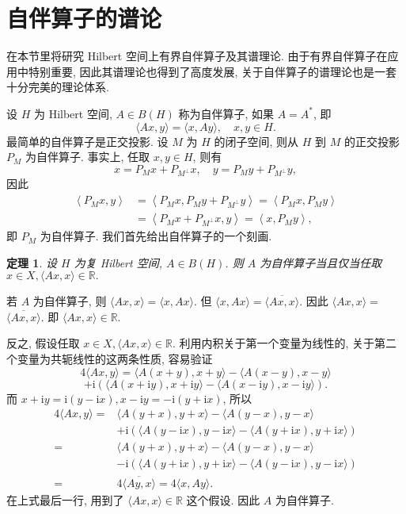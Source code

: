 \documentclass[openany]{ctexbook}
\makeatletter
\theoremstyle{kaiti}
\newtheorem{theorem}{定理}[section]
\theoremstyle{normal}
\renewenvironment{proof}[1][\proofname]{\par
    \pushQED{\qed}%
    \normalfont \topsep6\p@\@plus6\p@\relax
    \trivlist
    \item\relax
    {\heiti #1}\hspace{2\labelsep}\ignorespaces
  }{%
    \popQED\endtrivlist\@endpefalse
  }
\makeatother
\begin{document}
\section{自伴算子的谱论}

在本节里将研究 Hilbert 空间上有界自伴算子及其谱理论. 由于有界自伴算子在应用中特别重要, 因此其谱理论也得到了高度发展, 关于自伴算子的谱理论也是一套十分完美的理论体系.

设 $H$ 为 Hilbert 空间, $A \in B(H)$ 称为自伴算子, 如果 $A=A^{*}$, 即
$$
\langle A x, y\rangle=\langle x, A y\rangle, \quad x, y \in H.
$$
最简单的自伴算子是正交投影. 设 $M$ 为 $H$ 的闭子空间, 则从 $H$ 到 $M$ 的正交投影 $P_{M}$ 为自伴算子. 事实上, 任取 $x, y \in H$, 则有
$$
x=P_{M} x+P_{M^{\perp}} x, \quad y=P_{M} y+P_{M^{\perp}} y,
$$
因此
$$
\begin{aligned}
\left\langle P_{M} x, y\right\rangle &=\left\langle P_{M} x, P_{M} y+P_{M^{\perp}} y\right\rangle=\left\langle P_{M} x, P_{M} y\right\rangle \\
&=\left\langle P_{M} x+P_{M^{\perp}} x, y\right\rangle=\left\langle x, P_{M} y\right\rangle,
\end{aligned}
$$
即 $P_{M}$ 为自伴算子. 我们首先给出自伴算子的一个刻画.

\begin{theorem}
设 $H$ 为复 Hilbert 空间, $A \in B(H)$. 则 $A$ 为自伴算子当且仅当任取 $x \in X,\langle A x, x\rangle \in \mathbb{R}.$
\end{theorem}

\begin{proof}
若 $A$ 为自伴算子, 则 $\langle A x, x\rangle=\langle x, A x\rangle$. 但 $\langle x, A x\rangle=\overline{\langle A x, x\rangle}$. 因此 $\langle A x, x\rangle=$ $\overline{\langle A x, x\rangle}$. 即 $\langle A x, x\rangle \in \mathbb{R}$.

反之, 假设任取 $x \in X,\langle A x, x\rangle \in \mathbb{R}$. 利用内积关于第一个变量为线性的, 关于第二个变量为共轭线性的这两条性质, 容易验证
$$
4\langle A x, y\rangle=\langle A(x+y), x+y\rangle-\langle A(x-y), x-y\rangle
$$
$$
+\mathrm{i}(\langle A(x+\mathrm{i} y), x+\mathrm{i} y\rangle-\langle A(x-\mathrm{i} y), x-\mathrm{i} y\rangle).
$$
而 $x+\mathrm{i} y=\mathrm{i}(y-\mathrm{i} x), x-\mathrm{i} y=-\mathrm{i}(y+\mathrm{i} x)$, 所以
$$
\begin{aligned}
4\langle A x, y\rangle=&\langle A(y+x), y+x\rangle-\langle A(y-x), y-x\rangle \\
&+\mathrm{i}(\langle A(y-\mathrm{i} x), y-\mathrm{i} x\rangle-\langle A(y+\mathrm{i} x), y+\mathrm{i} x\rangle) \\
=&\langle A(y+x), y+x\rangle-\langle A(y-x), y-x\rangle \\
&-\mathrm{i}(\langle A(y+\mathrm{i} x), y+\mathrm{i} x\rangle-\langle A(y-\mathrm{i} x), y-\mathrm{i} x\rangle) \\
=& 4 \overline{\langle A y, x\rangle}=4\langle x, A y\rangle.
\end{aligned}
$$
在上式最后一行, 用到了 $\langle A x, x\rangle \in \mathbb{R}$ 这个假设. 因此 $A$ 为自伴算子.
\end{proof}
\end{document}
